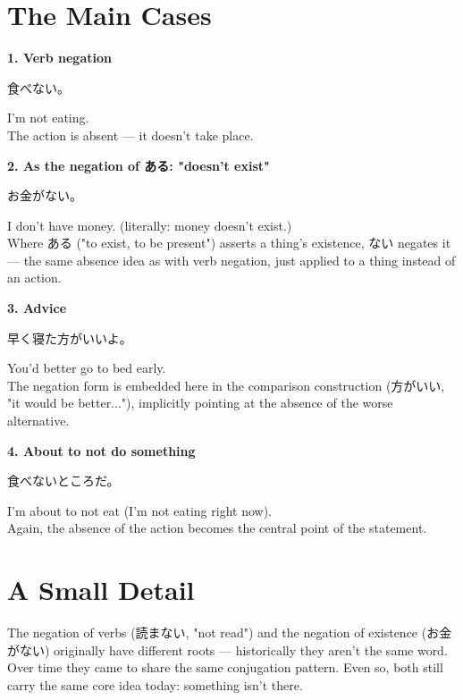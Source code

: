 \documentclass[12pt]{book}
\begin{document}
\section*{The Main Cases}

\textbf{1. Verb negation}
\par\quad 食べない。\\
\par\quad I'm not eating.\\

The action is absent — it doesn't take place.

\textbf{2. As the negation of ある: "doesn't exist"}
\par\quad お金がない。\\
\par\quad I don't have money. (literally: money doesn't exist.)\\

Where ある ("to exist, to be present") asserts a thing's existence, ない negates it — the same absence idea as with verb negation, just applied to a thing instead of an action.

\textbf{3. Advice}
\par\quad 早く寝た方がいいよ。\\
\par\quad You'd better go to bed early.\\

The negation form is embedded here in the comparison construction (方がいい, "it would be better..."), implicitly pointing at the absence of the worse alternative.

\textbf{4. About to not do something}
\par\quad 食べないところだ。\\
\par\quad I'm about to not eat (I'm not eating right now).\\

Again, the absence of the action becomes the central point of the statement.

\section*{A Small Detail}

The negation of verbs (読まない, "not read") and the negation of existence (お金がない) originally have different roots — historically they aren't the same word. Over time they came to share the same conjugation pattern. Even so, both still carry the same core idea today: something isn't there.
\end{document}

